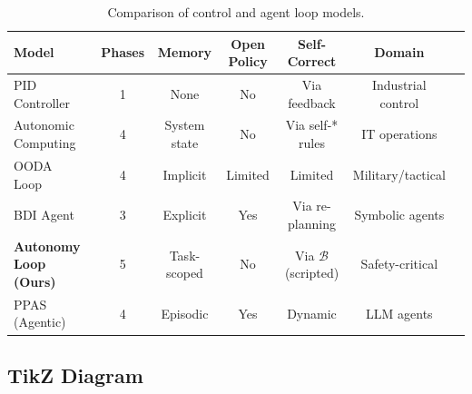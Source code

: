 \documentclass[12pt, a4paper]{article}
\begin{document}
\begin{table}[ht]
\centering
\caption{Comparison of control and agent loop models.}
\label{tab:loop-comparison}
\begin{tabular}{lcccccc}
\toprule
\textbf{Model} & \textbf{Phases} & \textbf{Memory} & \textbf{Open Policy} & \textbf{Self-Correct} & \textbf{Domain} \\
\midrule
PID Controller~\citep{astrom2006pid}         & 1 & None      & No  & Via feedback & Industrial control \\
Autonomic Computing~\citep{kephart2003autonomic} & 4 & System state & No & Via self-* rules & IT operations \\
OODA Loop~\citep{boyd1987ooda}               & 4 & Implicit  & Limited & Limited & Military/tactical \\
BDI Agent~\citep{rao1995bdi}                 & 3 & Explicit  & Yes & Via re-planning & Symbolic agents \\
\textbf{Autonomy Loop (Ours)}                & 5 & Task-scoped & No & Via $\mathcal{B}$ (scripted) & Safety-critical \\
PPAS (Agentic)~\citep{mahdi2026agentic}      & 4 & Episodic  & Yes & Dynamic & LLM agents \\
\bottomrule
\end{tabular}
\end{table}

\subsection{TikZ Diagram}
\end{document}
